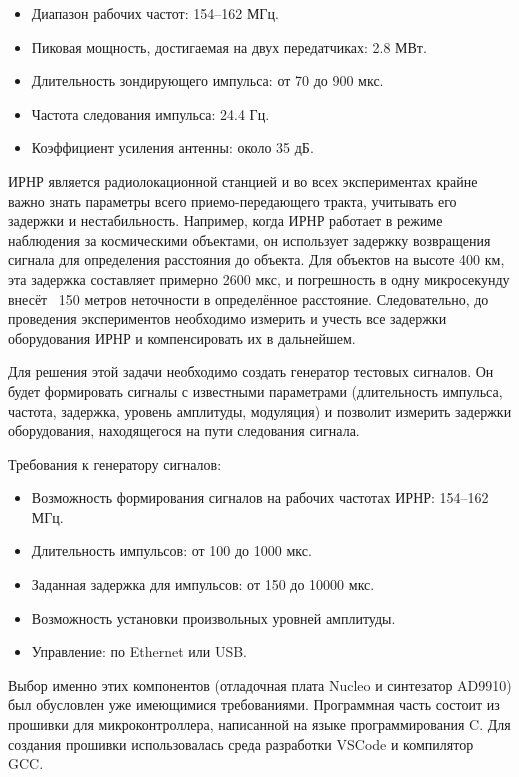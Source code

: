 \documentclass[rusmathsym, eqnumwithinsec, amspack, hyperref]{bomgost}
\begin{document}
\begin{itemize}
	\item Диапазон рабочих частот: 154--162 МГц.
	\item Пиковая мощность, достигаемая на двух передатчиках: 2.8 МВт.
	\item Длительность зондирующего импульса: от 70 до 900 мкс.
	\item Частота следования импульса: 24.4 Гц.
	\item Коэффициент усиления антенны: около 35 дБ.
\end{itemize}

ИРНР является радиолокационной станцией и во всех экспериментах крайне важно знать параметры всего приемо-передающего тракта, учитывать его задержки и нестабильность. Например, когда ИРНР работает в режиме наблюдения за космическими объектами, он использует задержку возвращения сигнала для определения расстояния до объекта. Для объектов на высоте 400 км, эта задержка составляет примерно 2600 мкс, и погрешность в одну микросекунду внесёт ~150 метров неточности в определённое расстояние. Следовательно, до проведения экспериментов необходимо измерить и учесть все задержки оборудования ИРНР и компенсировать их в дальнейшем.

Для решения этой задачи необходимо создать генератор тестовых сигналов. Он будет формировать сигналы с известными параметрами (длительность импульса, частота, задержка, уровень амплитуды, модуляция) и позволит измерить задержки оборудования, находящегося на пути следования сигнала.

Требования к генератору сигналов:

\begin{itemize}
	\item Возможность формирования сигналов на рабочих частотах ИРНР: 154--162 МГц.
	\item Длительность импульсов: от 100 до 1000 мкс.
	\item Заданная задержка для импульсов: от 150 до 10000 мкс.
	\item Возможность установки произвольных уровней амплитуды.
	\item Управление: по Ethernet или USB.
\end{itemize}

Выбор именно этих компонентов (отладочная плата Nucleo и синтезатор AD9910) был обусловлен уже имеющимися требованиями. Программная часть состоит из прошивки для микроконтроллера, написанной на языке программирования C. Для создания прошивки использовалась среда разработки VSCode и компилятор GCC.
\end{document}
